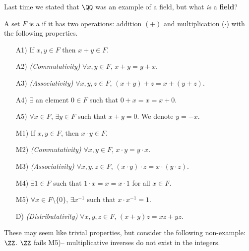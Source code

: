 

\begin{question}
Last time we stated that $\QQ$ was an example of a field, but what \textit{is} a \textbf{field}?
\end{question}
\begin{definition}[Field]
A set $F$ is a  if it has two operations: addition $(+)$ and multiplication ($\cdot$) with the following properties.
\begin{enumerate}
    \item[A1)] If $x,y\in F$ then $x+y \in F$.
    \item[A2)] \textit{(Commutativity)} $\forall x,y\in F$, $x+y= y+x$.
    \item[A3)] \textit{(Associativity)} $\forall x,y,z\in F$, $(x+y)+z = x+(y+z)$.
    \item[A4)] $\exists$ an element $0\in F$ such that $0+x = x = x+0$.
    \item[A5)] $\forall x\in F$, $\exists y\in F$ such that $x+y=0$. We denote $y=-x$.
    \item[M1)] If $x,y\in F$, then $x\cdot y\in F$.
    \item[M2)] \textit{(Commutativity)} $\forall x,y\in F$, $x\cdot y= y\cdot x$.
    \item[M3)] \textit{(Associativity)} $\forall x,y,z\in F$, $(x\cdot y)\cdot z= x\cdot (y\cdot z)$.
    \item[M4)] $\exists 1\in F$ such that $1\cdot x = x = x\cdot 1$ for all $x\in F$.
    \item[M5)] $\forall x\in F\setminus\{0\}$, $\exists x^{-1}$ such that $x\cdot x^{-1} = 1.$
    \item[D)] \textit{(Distributativity)} $\forall x,y,z\in F$, $(x+y)z = xz+yz.$
\end{enumerate}
\end{definition}
These may seem like trivial properties, but consider the following non-example: $\ZZ$. $\ZZ$ fails M5)-- multiplicative inverses do not exist in the integers.

